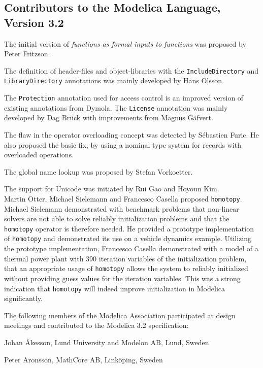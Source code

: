 \subsection{Contributors to the Modelica Language, Version 3.2}\label{contributors-to-the-modelica-language-version-3-2}

The initial version of \emph{functions as formal inputs to functions} was
proposed by Peter Fritzson.

The definition of header-files and object-libraries with the
\lstinline!IncludeDirectory! and \lstinline!LibraryDirectory! annotations was mainly
developed by Hans Olsson.

The \lstinline!Protection! annotation used for access control is an improved version of existing annotations from Dymola.  The \lstinline!License! annotation was mainly developed by Dag Brück with improvements from Magnus Gäfvert.

The flaw in the operator overloading concept was detected by Sébastien
Furic. He also proposed the basic fix, by using a nominal type system
for records with overloaded operations.

The global name lookup was proposed by Stefan Vorkoetter.

The support for Unicode was initiated by Rui Gao and Hoyoun Kim.\\
Martin Otter, Michael Sielemann and Francesco Casella proposed \lstinline!homotopy!.  Michael Sielemann demonstrated with benchmark problems that non-linear solvers are not able to solve reliably initialization problems and that the \lstinline!homotopy! operator is therefore needed.  He provided a prototype implementation of \lstinline!homotopy! and demonstrated its use on a vehicle dynamics example.  Utilizing the prototype implementation, Francesco Casella demonstrated with a model of a thermal power plant with 390 iteration variables of the initialization problem, that an appropriate usage of \lstinline!homotopy! allows the system to reliably initialized without providing guess values for the iteration variables.  This was a strong indication that \lstinline!homotopy! will indeed improve initialization in Modelica significantly.

The following members of the Modelica Association participated at design
meetings and contributed to the Modelica 3.2 specification:

Johan Åkesson, Lund University and Modelon AB, Lund, Sweden

Peter Aronsson, MathCore AB, Linköping, Sweden

